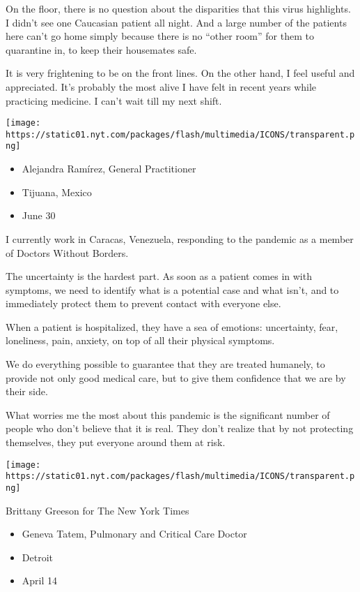 On the floor, there is no question about the disparities that this virus
highlights. I didn't see one Caucasian patient all night. And a large
number of the patients here can't go home simply because there is no
``other room'' for them to quarantine in, to keep their housemates safe.

It is very frightening to be on the front lines. On the other hand, I
feel useful and appreciated. It's probably the most alive I have felt in
recent years while practicing medicine. I can't wait till my next shift.

\texttt{[image: https://static01.nyt.com/packages/flash/multimedia/ICONS/transparent.png]}

\begin{itemize}
\tightlist
\item
  Alejandra Ramírez, General Practitioner
\item
  Tijuana, Mexico
\item
  June 30
\end{itemize}

I currently work in Caracas, Venezuela, responding to the pandemic as a
member of Doctors Without Borders.

The uncertainty is the hardest part. As soon as a patient comes in with
symptoms, we need to identify what is a potential case and what isn't,
and to immediately protect them to prevent contact with everyone else.

When a patient is hospitalized, they have a sea of emotions:
uncertainty, fear, loneliness, pain, anxiety, on top of all their
physical symptoms.

We do everything possible to guarantee that they are treated humanely,
to provide not only good medical care, but to give them confidence that
we are by their side.

What worries me the most about this pandemic is the significant number
of people who don't believe that it is real. They don't realize that by
not protecting themselves, they put everyone around them at risk.

\texttt{[image: https://static01.nyt.com/packages/flash/multimedia/ICONS/transparent.png]}

Brittany Greeson for The New York Times

\begin{itemize}
\tightlist
\item
  Geneva Tatem, Pulmonary and Critical Care Doctor
\item
  Detroit
\item
  April 14
\end{itemize}

